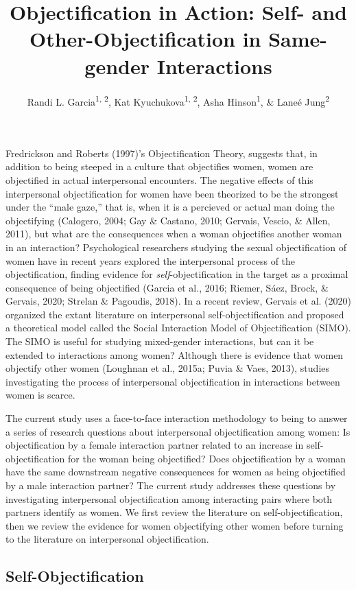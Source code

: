 \documentclass[man]{apa6}
\title{Objectification in Action: Self- and Other-Objectification in
Same-gender Interactions}
\author{Randi L. Garcia\textsuperscript{1, 2}, Kat
Kyuchukova\textsuperscript{1, 2}, Asha Hinson\textsuperscript{1}, \&
Laneé Jung\textsuperscript{2}}
\date{}
\affiliation{
\vspace{0.5cm}
\textsuperscript{1} Department of Psychology, Smith College\\\textsuperscript{2} Program in Statistical and Data Sciences, Smith College}
\begin{document}
\maketitle

Fredrickson and Roberts (1997)'s Objectification Theory, suggests that,
in addition to being steeped in a culture that objectifies women, women
are objectified in actual interpersonal encounters. The negative effects
of this interpersonal objectification for women have been theorized to
be the strongest under the \enquote{male gaze,} that is, when it is a
percieved or actual man doing the objectifying (Calogero, 2004; Gay \&
Castano, 2010; Gervais, Vescio, \& Allen, 2011), but what are the
consequences when a woman objectifies another woman in an interaction?
Psychological researchers studying the sexual objectification of women
have in recent years explored the interpersonal process of the
objectification, finding evidence for \emph{self}-objectification in the
target as a proximal consequence of being objectified (Garcia et al.,
2016; Riemer, Sáez, Brock, \& Gervais, 2020; Strelan \& Pagoudis, 2018).
In a recent review, Gervais et al. (2020) organized the extant
literature on interpersonal self-objectification and proposed a
theoretical model called the Social Interaction Model of Objectification
(SIMO). The SIMO is useful for studying mixed-gender interactions, but
can it be extended to interactions among women? Although there is
evidence that women objectify other women (Loughnan et al., 2015a; Puvia
\& Vaes, 2013), studies investigating the process of interpersonal
objectification in interactions between women is scarce.

The current study uses a face-to-face interaction methodology to being
to answer a series of research questions about interpersonal
objectification among women: Is objectification by a female interaction
partner related to an increase in self-objectification for the woman
being objectified? Does objectification by a woman have the same
downstream negative consequences for women as being objectified by a
male interaction partner? The current study addresses these questions by
investigating interpersonal objectification among interacting pairs
where both partners identify as women. We first review the literature on
self-objectification, then we review the evidence for women objectifying
other women before turning to the literature on interpersonal
objectification.

\subsection{Self-Objectification}\label{self-objectification}
\end{document}
